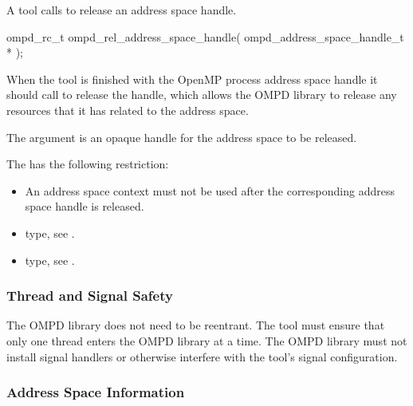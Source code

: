 \label{subsubsubsec:ompd_rel_address_space_handle}

\summary
A tool calls  to release an address space
handle.

\format
\begin{cspecific}
\begin{ompSyntax}
ompd_rc_t ompd_rel_address_space_handle(
  ompd_address_space_handle_t *
);
\end{ompSyntax}
\end{cspecific}

\descr
When the tool is finished with the OpenMP process address space handle it
should call  to release the handle, 
which allows the OMPD library to release any resources that it has related 
to the address space.

\argdesc
The  argument is an opaque handle for the address space to be released.

\restrictions
The  has the following restriction:

\begin{itemize}
\item An address space context must not be used after the corresponding 
      address space handle is released.
\end{itemize}

\crossreferences
\begin{itemize}
\item {} type, 
see .

\item {} type, see .
\end{itemize}



\subsubsection{Thread and Signal Safety}

The OMPD library does not need to be reentrant. The tool must ensure that only 
one thread enters the OMPD library at a time. The OMPD library must not install 
signal handlers or otherwise interfere with the tool's signal configuration.



\subsubsection{Address Space Information}

